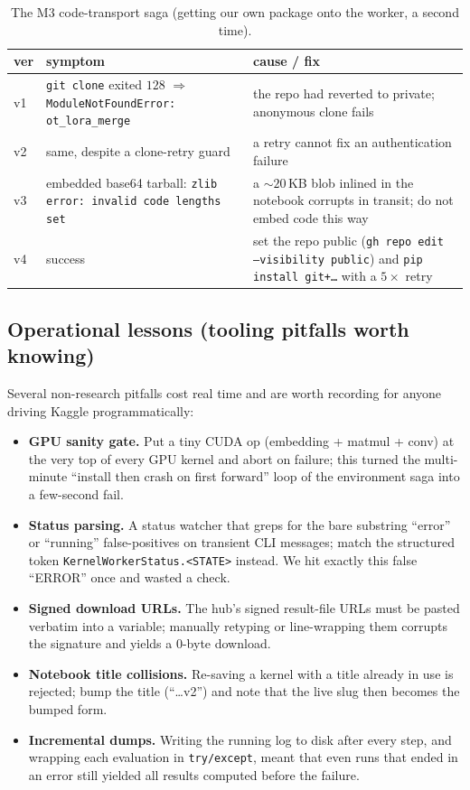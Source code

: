 \begin{table}[h]
\centering
\caption{The M3 code-transport saga (getting our own package onto the worker, a second time).}
\label{tab:m3saga}
\small
\begin{tabular}{p{0.6cm} p{6.3cm} p{7.4cm}}
\toprule
ver & symptom & cause / fix \\
\midrule
v1 & \texttt{git clone} exited $128$ $\Rightarrow$ \texttt{ModuleNotFoundError: ot\_lora\_merge} & the repo
had reverted to private; anonymous clone fails \\
v2 & same, despite a clone-retry guard & a retry cannot fix an authentication failure \\
v3 & embedded base64 tarball: \texttt{zlib error: invalid code lengths set} & a $\sim\!20$\,KB blob inlined
in the notebook corrupts in transit; do not embed code this way \\
v4 & success & set the repo public (\texttt{gh repo edit --visibility public}) and
\texttt{pip install git+\dots} with a $5\times$ retry \\
\bottomrule
\end{tabular}
\end{table}

\subsection{Operational lessons (tooling pitfalls worth knowing)}
\label{app:ops}
Several non-research pitfalls cost real time and are worth recording for anyone driving Kaggle
programmatically:
\begin{itemize}[leftmargin=1.4em,itemsep=2pt]
\item \textbf{GPU sanity gate.} Put a tiny CUDA op (embedding + matmul + conv) at the very top of every GPU
kernel and abort on failure; this turned the multi-minute ``install then crash on first forward'' loop of
the environment saga into a few-second fail.
\item \textbf{Status parsing.} A status watcher that greps for the bare substring ``error'' or ``running''
false-positives on transient CLI messages; match the structured token \texttt{KernelWorkerStatus.<STATE>}
instead. We hit exactly this false ``ERROR'' once and wasted a check.
\item \textbf{Signed download URLs.} The hub's signed result-file URLs must be pasted verbatim into a
variable; manually retyping or line-wrapping them corrupts the signature and yields a $0$-byte download.
\item \textbf{Notebook title collisions.} Re-saving a kernel with a title already in use is rejected; bump
the title (``\dots v2'') and note that the live slug then becomes the bumped form.
\item \textbf{Incremental dumps.} Writing the running log to disk after every step, and wrapping each
evaluation in \texttt{try/except}, meant that even runs that ended in an error still yielded all results
computed before the failure.
\end{itemize}

